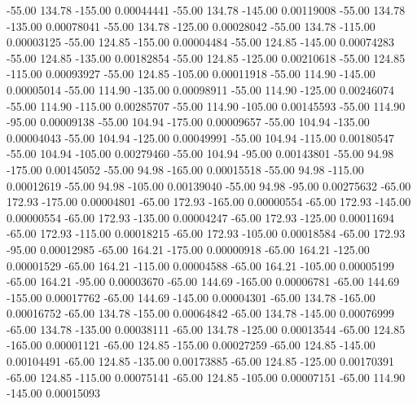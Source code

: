     -55.00    134.78   -155.00     0.00044441
    -55.00    134.78   -145.00     0.00119008
    -55.00    134.78   -135.00     0.00078041
    -55.00    134.78   -125.00     0.00028042
    -55.00    134.78   -115.00     0.00003125
    -55.00    124.85   -155.00     0.00004484
    -55.00    124.85   -145.00     0.00074283
    -55.00    124.85   -135.00     0.00182854
    -55.00    124.85   -125.00     0.00210618
    -55.00    124.85   -115.00     0.00093927
    -55.00    124.85   -105.00     0.00011918
    -55.00    114.90   -145.00     0.00005014
    -55.00    114.90   -135.00     0.00098911
    -55.00    114.90   -125.00     0.00246074
    -55.00    114.90   -115.00     0.00285707
    -55.00    114.90   -105.00     0.00145593
    -55.00    114.90    -95.00     0.00009138
    -55.00    104.94   -175.00     0.00009657
    -55.00    104.94   -135.00     0.00004043
    -55.00    104.94   -125.00     0.00049991
    -55.00    104.94   -115.00     0.00180547
    -55.00    104.94   -105.00     0.00279460
    -55.00    104.94    -95.00     0.00143801
    -55.00     94.98   -175.00     0.00145052
    -55.00     94.98   -165.00     0.00015518
    -55.00     94.98   -115.00     0.00012619
    -55.00     94.98   -105.00     0.00139040
    -55.00     94.98    -95.00     0.00275632
    -65.00    172.93   -175.00     0.00004801
    -65.00    172.93   -165.00     0.00000554
    -65.00    172.93   -145.00     0.00000554
    -65.00    172.93   -135.00     0.00004247
    -65.00    172.93   -125.00     0.00011694
    -65.00    172.93   -115.00     0.00018215
    -65.00    172.93   -105.00     0.00018584
    -65.00    172.93    -95.00     0.00012985
    -65.00    164.21   -175.00     0.00000918
    -65.00    164.21   -125.00     0.00001529
    -65.00    164.21   -115.00     0.00004588
    -65.00    164.21   -105.00     0.00005199
    -65.00    164.21    -95.00     0.00003670
    -65.00    144.69   -165.00     0.00006781
    -65.00    144.69   -155.00     0.00017762
    -65.00    144.69   -145.00     0.00004301
    -65.00    134.78   -165.00     0.00016752
    -65.00    134.78   -155.00     0.00064842
    -65.00    134.78   -145.00     0.00076999
    -65.00    134.78   -135.00     0.00038111
    -65.00    134.78   -125.00     0.00013544
    -65.00    124.85   -165.00     0.00001121
    -65.00    124.85   -155.00     0.00027259
    -65.00    124.85   -145.00     0.00104491
    -65.00    124.85   -135.00     0.00173885
    -65.00    124.85   -125.00     0.00170391
    -65.00    124.85   -115.00     0.00075141
    -65.00    124.85   -105.00     0.00007151
    -65.00    114.90   -145.00     0.00015093
